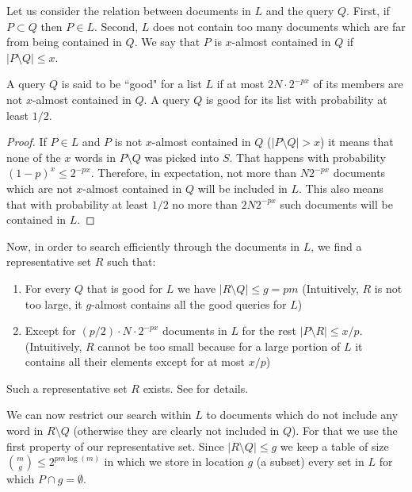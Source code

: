 \documentclass{article}
\begin{document}
Let us consider the relation between documents in $L$ and the query $Q$.
First, if $P\subset Q$ then $P \in L$.
Second, $L$ does not contain too many documents which are far from being contained in $Q$. 
We say that $P$ is $x$-almost contained in $Q$ if $|P \setminus Q| \le x$.
\begin{fact}
A query $Q$ is said to be ``good" for a list $L$ if at most $2N \cdot 2^{-px}$ of its members 
are not $x$-almost contained in $Q$. A query $Q$ is good for its list with probability at least $1/2$.
\end{fact}
\begin{proof}
If $P \in L$ and  $P$ is not $x$-almost contained in $Q$ ($|P \setminus Q| > x$) it means that 
none of the $x$ words in $P\setminus Q$ was picked into $S$. That happens with probability $(1-p)^{x} \le 2^{-px}$.
Therefore, in expectation, not more than $N2^{-px}$ documents which are not  $x$-almost contained in $Q$
will be included in $L$. This also means that with probability at least $1/2$ no more than $2N2^{-px}$ such 
documents will be contained in $L$.
\end{proof}

Now, in order to search efficiently through the documents in $L$, we find a representative set $R$ such that:
\begin{enumerate}
\item For every $Q$ that is good for $L$ we have $|R \setminus Q| \le g = pm$ (Intuitively, $R$ is not too large, it $g$-almost contains all the good queries for $L$) 
\item Except for $(p/2)\cdot N\cdot2^{-px}$ documents in $L$ for the rest $|P \setminus R| \le x/p$. (Intuitively, $R$ cannot be too small because for
a large portion of $L$ it contains all their elements except for at most $x/p$)
\end{enumerate}
\begin{lemma}
Such a representative set $R$ exists. See \cite{CIP02} for details.
\end{lemma}
We can now restrict our search within $L$ to documents which
do not include any word in $R \setminus Q$ (otherwise they are clearly not included in $Q$).
For that we use the first property of our representative set. Since  $|R \setminus Q| \le g$ we keep a table of
size ${m \choose g} \le 2^{pm\log(m)}$ in which we store in location $g$ (a subset) every set in $L$ for which $ P \cap g = \emptyset$.
\end{document}
